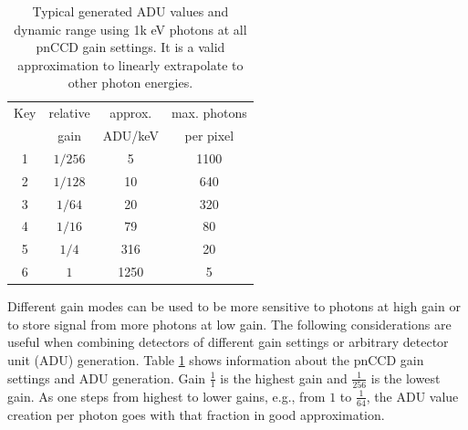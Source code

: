 \begin{table}%
\centering
\begin{tabular}{ |c c c c |}
 \hline
 Key & relative  & approx.  & max. photons \\ 
     &   gain    & ADU/keV  & per pixel  \\
 \hline
 1 & $1/256$ & 5 & 1100  \\
 2 & $1/128$ & 10 & 640   \\
 3 & $1/64$ & 20 & 320   \\
 4 & $1/16$ & 79 & 80  \\
 5 & $1/4$ & 316 & 20  \\
 6 & $1$ & 1250 & 5  \\
 \hline
\end{tabular}
\caption[pnCCD gain modes and typical ADU values at 1k eV photons.]{Typical generated ADU values and dynamic range using 1k eV photons at all pnCCD gain settings. It is a valid approximation to linearly extrapolate to other photon energies.}
\label{tab:gain-modes}
\end{table}
Different gain modes can be used to be more sensitive to photons at high gain or to store signal from more photons at low gain.
The following considerations are useful when combining detectors of different gain settings or arbitrary detector unit (ADU) generation. Table \ref{tab:gain-modes} shows information about the pnCCD gain settings and ADU generation. 
Gain $\tfrac{1}{1}$ is the highest gain and $\tfrac{1}{256}$ is the lowest gain. As one steps from highest to lower gains, e.g., from $1$ to $\tfrac{1}{64}$, the ADU value creation per photon goes with that fraction in good approximation.\\[1\baselineskip]
%
